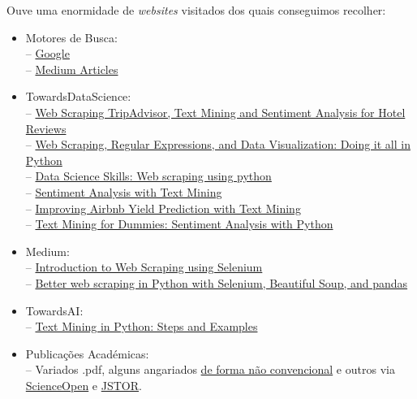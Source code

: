 \documentclass[a4paper,10pt]{article}
\begin{document}
Ouve uma enormidade de \textit{websites} visitados dos quais conseguimos recolher:
\begin{itemize}
  \item Motores de Busca:
  \\ -- \href{https://www.google.com/}{Google}
  \\ -- \href{https://www.medium.com/}{Medium Articles}
  \item TowardsDataScience:
  \\ -- \href{https://towardsdatascience.com/scraping-tripadvisor-text-mining-and-sentiment-analysis-for-hotel-reviews-cc4e20aef333}{Web Scraping TripAdvisor, Text Mining and Sentiment Analysis for Hotel Reviews}
  \\ -- \href{https://towardsdatascience.com/web-scraping-regular-expressions-and-data-visualization-doing-it-all-in-python-37a1aade7924}{Web Scraping, Regular Expressions, and Data Visualization: Doing it all in Python}
  \\ -- \href{https://towardsdatascience.com/data-science-skills-web-scraping-using-python-d1a85ef607ed}{Data Science Skills: Web scraping using python}
  \\ -- \href{https://towardsdatascience.com/sentiment-analysis-with-text-mining-13dd2b33de27}{Sentiment Analysis with Text Mining}
  \\ -- \href{https://towardsdatascience.com/improving-airbnb-yield-prediction-with-text-mining-9472c0181731}{Improving Airbnb Yield Prediction with Text Mining}
  \\ -- \href{https://towardsdatascience.com/text-mining-for-dummies-text-classification-with-python-98e47c3a9deb}{Text Mining for Dummies: Sentiment Analysis with Python}
  \item Medium:
  \\ -- \href{https://medium.com/the-andela-way/introduction-to-web-scraping-using-selenium-7ec377a8cf72}{Introduction to Web Scraping using Selenium}
  \\ -- \href{https://medium.com/free-code-camp/better-web-scraping-in-python-with-selenium-beautiful-soup-and-pandas-d6390592e251}{Better web scraping in Python with Selenium, Beautiful Soup, and pandas}
  \item TowardsAI:
  \\ -- \href{https://pub.towardsai.net/text-mining-in-python-steps-and-examples-78b3f8fd913b}{Text Mining in Python: Steps and Examples}
  \item Publicações Académicas:
  \\ -- Variados .pdf, alguns angariados \href{https://sci-hub.41610.org/sci-hub-mirrors}{de forma não convencional} e outros via \href{https://www.scienceopen.com/search}{ScienceOpen} e \href{https://www.jstor.org/action/doBasicSearch?Query=text+mining}{JSTOR}.

\end{itemize}
\end{document}
